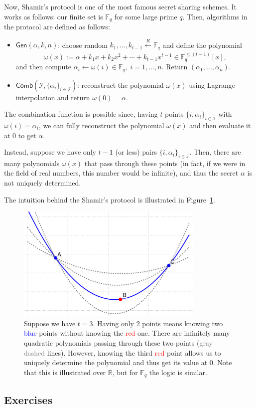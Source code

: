 \documentclass[../lecture-notes-148x210.tex]{subfiles}
\begin{document}
Now, Shamir's protocol is one of the most famous secret sharing schemes. It works as follows: our finite set is $\mathbb{F}_q$ for some large prime $q$. Then, algorithms in the protocol are defined as follows:
\begin{itemize}
    \item $\mathsf{Gen}(\alpha, k, n)$: choose random $k_1,\dots,k_{t-1} \xleftarrow[]{R} \mathbb{F}_q$ and define the polynomial
    \begin{equation*}
        \omega(x) := \alpha + k_1x + k_2x^2 + \cdots + k_{t-1}x^{t-1} \in \mathbb{F}_q^{\leq (t-1)}[x],     
    \end{equation*}
    and then compute $\alpha_i \gets \omega(i) \in \mathbb{F}_q, \; i = 1,\dots,n$. Return $(\alpha_1,\dots,\alpha_n)$.
    \item $\mathsf{Comb}(\mathcal{I}, \{\alpha_i\}_{i \in \mathcal{I}})$: reconstruct the polynomial $\omega(x)$ using Lagrange interpolation and return $\omega(0) = \alpha$.
\end{itemize}

The combination function is possible since, having $t$ points $\{i,\alpha_i\}_{i \in \mathcal{I}}$ with $\omega(i) = \alpha_i$, we can fully reconstruct the polynomial $\omega(x)$ and then evaluate it at $0$ to get $\alpha$.

Instead, suppose we have only $t-1$ (or less) pairs $\{i,\alpha_i\}_{i \in \mathcal{I}}$. Then, there are many polynomials $\omega(x)$ that pass through these points (in fact, if we were in the field of real numbers, this number would be infinite), and thus the secret $\alpha$ is not uniquely determined.

The intuition behind the Shamir's protocol is illustrated in Figure~\ref{fig:shamir}.

\begin{figure}[H]
    \centering
    \includegraphics[width=0.8\textwidth]{images/lecture_1/shamir_demo.pdf}
    \caption{Suppose we have $t=3$. Having only 2 points means knowing two \textcolor{blue}{blue} points without knowing the \textcolor{red}{red} one. There are infinitely many quadratic polynomials passing through these two points (\textcolor{gray}{gray dashed} lines). However, knowing the third \textcolor{red}{red} point allows us to uniquely determine the polynomial and thus get its value at $0$. Note that this is illustrated over $\mathbb{R}$, but for $\mathbb{F}_q$ the logic is similar.}
    \label{fig:shamir}
\end{figure}

\subsection{Exercises}
\end{document}
